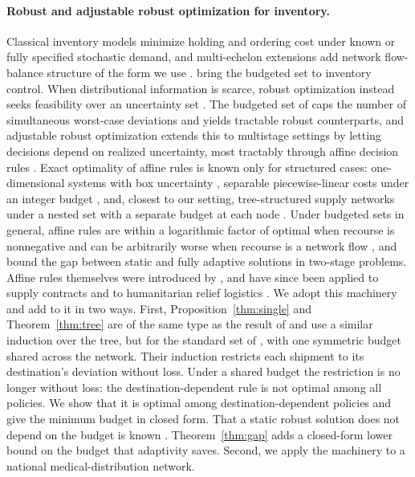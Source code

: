 \documentclass[11pt]{article}
\begin{document}
\paragraph{Robust and adjustable robust optimization for inventory.}
Classical inventory models minimize holding and ordering cost under known or fully specified stochastic demand, and multi-echelon extensions add network flow-balance structure of the form we use \citep{perea3}.
\citet{bertsimasthiele06} bring the budgeted set to inventory control.
When distributional information is scarce, robust optimization instead seeks feasibility over an uncertainty set \citep{bental}.
The budgeted set of \citet{bertsim04} caps the number of simultaneous worst-case deviations and yields tractable robust counterparts, and adjustable robust optimization extends this to multistage settings by letting decisions depend on realized uncertainty, most tractably through affine decision rules \citep{yanikoglu2018aro}.
Exact optimality of affine rules is known only for structured cases: one-dimensional systems with box uncertainty \citep{bip10}, separable piecewise-linear costs under an integer budget \citep{ardestani16}, and, closest to our setting, tree-structured supply networks under a nested set with a separate budget at each node \citep{simchilevi19}.
Under budgeted sets in general, affine rules are within a logarithmic factor of optimal when recourse is nonnegative and can be arbitrarily worse when recourse is a network flow \citep{elhousni21}, and \citet{bg10} bound the gap between static and fully adaptive solutions in two-stage problems.
Affine rules themselves were introduced by \citet{bengoryashko04}, and have since been applied to supply contracts \citep{bengolany05} and to humanitarian relief logistics \citep{benchung11}.
We adopt this machinery and add to it in two ways.
First, Proposition~\ref{thm:single} and Theorem~\ref{thm:tree} are of the same type as the result of \citet{simchilevi19} and use a similar induction over the tree, but for the standard set of \citet{bertsim04}, with one symmetric budget shared across the network.
Their induction restricts each shipment to its destination's deviation without loss. Under a shared budget the restriction is no longer without loss: the destination-dependent rule is not optimal among all policies. We show that it is optimal among destination-dependent policies and give the minimum budget in closed form.
That a static robust solution does not depend on the budget is known \citep{atamturk07}. Theorem~\ref{thm:gap} adds a closed-form lower bound on the budget that adaptivity saves.
Second, we apply the machinery to a national medical-distribution network.
\end{document}
